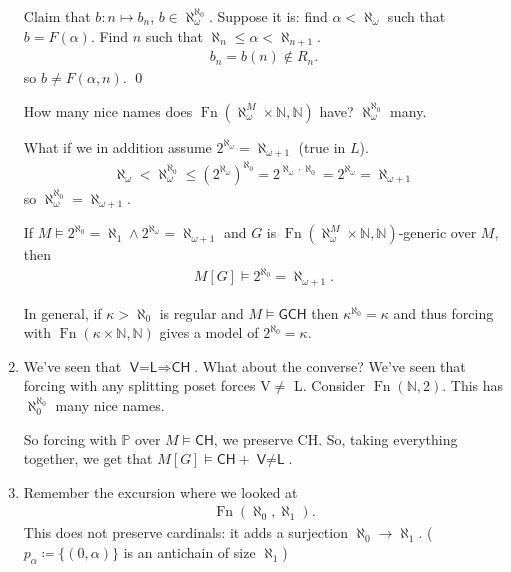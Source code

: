 \documentclass{article}
\newcommand{\p}{\mathbb{P}}
\newcommand{\1}{\mathbbm{1}}
\DeclareMathOperator{\Fn}{Fn}
\let\models\vDash
\begin{document}
\begin{enumerate}
    Claim that $b:n \mapsto b_n$, $b \in \aleph_\omega^{\aleph_0}$.
    Suppose it is: find $\alpha < \aleph_\omega$ such that $b = F(\alpha)$.
    Find $n$ such that $\aleph_n \leq \alpha < \aleph_{n+1}$.
    \begin{align*}
      b_n = b(n) \notin R_n.
    \end{align*}
    so $b \neq F(\alpha,n)$. \qed

    How many nice names does $\operatorname{Fn}(\aleph_\omega^M \times \mathbb{N}, \mathbb{N})$ have? $\aleph_\omega^{\aleph_0}$ many.

    What if we in addition assume $2^{\aleph_\omega} = \aleph_{\omega+1}$ (true in $L$).
    \begin{align*}
      \aleph_\omega < \aleph_\omega^{\aleph_0} \leq (2^{\aleph_\omega})^{\aleph_0} = 2^{\aleph_\omega \cdot \aleph_0} = 2^{\aleph_\omega} = \aleph_{\omega+1}
    \end{align*}
    so $\aleph_\omega^{\aleph_0} = \aleph_{\omega+1}$.
    \begin{cor}
      If $M \models 2^{\aleph_0} = \aleph_1 \land 2^{\aleph_\omega} = \aleph_{\omega+1}$ and $G$ is $\operatorname{Fn}(\aleph_\omega^M \times \mathbb{N}, \mathbb{N})$-generic over $M$, then
      \begin{align*}
        M[G] \models 2^{\aleph_0} = \aleph_{\omega+1}.
      \end{align*}
    \end{cor}
    In general, if $\kappa > \aleph_0$ is regular and $M \models \textsf{GCH}$ then $\kappa^{\aleph_0} = \kappa$ and thus forcing with $\Fn(\kappa \times \mathbb{N}, \mathbb{N})$ gives a model of $2^{\aleph_0} = \kappa$.

  \item We've seen that $\textsf{V=L} \Rightarrow \textsf{CH}$. What about the converse?
    We've seen that forcing with any splitting poset forces \textsf{V$\neq$ L}.
    Consider $\Fn(\mathbb{N},2)$. This has $\aleph_0^{\aleph_0}$ many nice names.

    So forcing with $\p$ over $M \models \textsf{CH}$, we preserve \textsf{CH}.
    So, taking everything together, we get that $M[G] \models \textsf{CH} + \textsf{V$\neq$L}$.
  \item Remember the excursion where we looked at
    \begin{align*}
      \Fn(\aleph_0, \aleph_1).
    \end{align*}
    This does not preserve cardinals: it adds a surjection $\aleph_0 \to \aleph_1$. ($p_\alpha \coloneqq \{(0,\alpha)\}$ is an antichain of size $\aleph_1$)

\end{enumerate}
\end{document}
